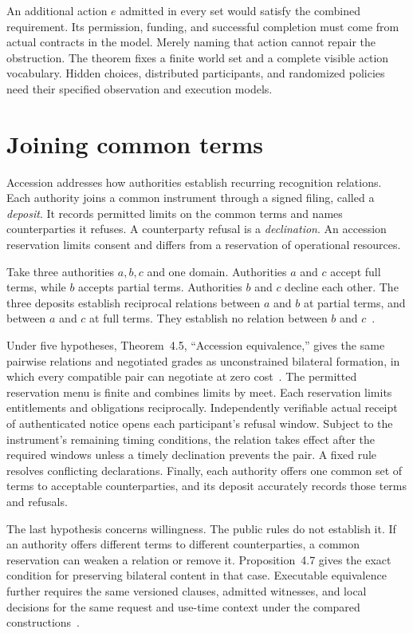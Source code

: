 \documentclass{momentum}
\begin{document}
An additional action $e$ admitted in every set would satisfy the combined requirement.
Its permission, funding, and successful completion must come from actual contracts in the model.
Merely naming that action cannot repair the obstruction.
The theorem fixes a finite world set and a complete visible action vocabulary.
Hidden choices, distributed participants, and randomized policies need their specified observation and execution models.

\section{Joining common terms}
\label{sec:accession}

Accession addresses how authorities establish recurring recognition relations.
Each authority joins a common instrument through a signed filing, called a \emph{deposit}.
It records permitted limits on the common terms and names counterparties it refuses.
A counterparty refusal is a \emph{declination}.
An accession reservation limits consent and differs from a reservation of operational resources.

Take three authorities $a,b,c$ and one domain.
Authorities $a$ and $c$ accept full terms, while $b$ accepts partial terms.
Authorities $b$ and $c$ decline each other.
The three deposits establish reciprocal relations between $a$ and $b$ at partial terms, and between $a$ and $c$ at full terms.
They establish no relation between $b$ and $c$~\cite[Section~2.2]{accession}.

Under five hypotheses, Theorem~4.5, ``Accession equivalence,'' gives the same pairwise relations and negotiated grades as unconstrained bilateral formation, in which every compatible pair can negotiate at zero cost~\cite[Section~4]{accession}.
The permitted reservation menu is finite and combines limits by meet.
Each reservation limits entitlements and obligations reciprocally.
Independently verifiable actual receipt of authenticated notice opens each participant's refusal window.
Subject to the instrument's remaining timing conditions, the relation takes effect after the required windows unless a timely declination prevents the pair.
A fixed rule resolves conflicting declarations.
Finally, each authority offers one common set of terms to acceptable counterparties, and its deposit accurately records those terms and refusals.

The last hypothesis concerns willingness.
The public rules do not establish it.
If an authority offers different terms to different counterparties, a common reservation can weaken a relation or remove it.
Proposition~4.7 gives the exact condition for preserving bilateral content in that case.
Executable equivalence further requires the same versioned clauses, admitted witnesses, and local decisions for the same request and use-time context under the compared constructions~\cite[Section~6.3, Proposition~6.1]{accession}.
\end{document}
